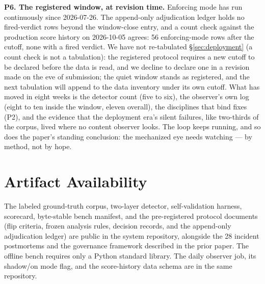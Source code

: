\documentclass[11pt]{article}
\begin{document}
\textbf{P6. The registered window, at revision time.} Enforcing mode has
run continuously since 2026-07-26. The append-only adjudication ledger
holds no fired-verdict rows beyond the window-close entry, and a count
check against the production score history on 2026-10-05 agrees: 56
enforcing-mode rows after the cutoff, none with a fired verdict. We have
not re-tabulated \S\ref{sec:deployment} (a count check is not a
tabulation): the registered protocol requires a new cutoff to be
declared before the data is read, and we decline to declare one in a
revision made on the eve of submission; the quiet window stands as
registered, and the next tabulation will append to the data inventory
under its own cutoff. What has moved in eight weeks is
the detector count (five to six), the observer's own log (eight to ten
inside the window, eleven overall), the disciplines that bind fixes
(P2), and the evidence that the deployment era's silent failures, like
two-thirds of the corpus, lived where no content observer looks. The
loop keeps running, and so does the paper's standing conclusion: the
mechanized eye needs watching --- by method, not by hope.

\section*{Artifact Availability}

The labeled ground-truth corpus, two-layer detector, self-validation
harness, scorecard, byte-stable bench manifest, and the pre-registered
protocol documents (flip criteria, frozen analysis rules, decision
records, and the append-only adjudication ledger) are public in the
system repository, alongside the 28 incident postmortems and the
governance framework described in the prior paper. The offline bench
requires only a Python standard library. The daily observer job, its
shadow/on mode flag, and the score-history data schema are in the same
repository.
\end{document}
